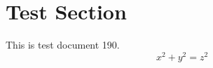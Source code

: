 \documentclass{article}
\begin{document}
\section{Test Section}
This is test document 190.
\begin{equation}
x^2 + y^2 = z^2
\end{equation}
\end{document}
